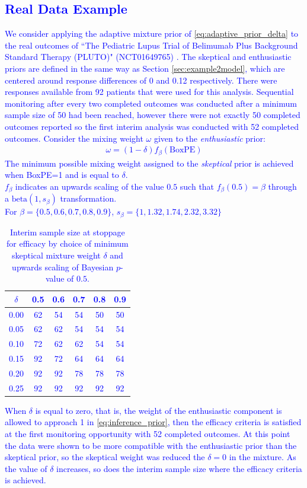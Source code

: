 \documentclass[AMA,STIX1COL,doublespace]{WileyNJD-v2}
\begin{document}
\textcolor{blue}{
\section{Real Data Example}
We consider applying the adaptive mixture prior of \eqref{eq:adaptive_prior_delta} to the real outcomes of ``The Pediatric Lupus Trial of Belimumab Plus Background Standard Therapy (PLUTO)" (NCT01649765) \citep{Brunner2020}. The skeptical and enthusiastic priors are defined in the same way as Section \ref{sec:example2model}, which are centered around response differences of 0 and 0.12 respectively. There were responses available from 92 patients that were used for this analysis. Sequential monitoring after every two completed outcomes was conducted after a minimum sample size of 50 had been reached, however there were not exactly 50 completed outcomes reported so the first interim analysis was conducted with 52 completed outcomes.
\newpage
Consider the mixing weight $\omega$ given to the \textit{enthusiastic} prior:
\begin{align*}
\omega= (1 - \delta)f_\beta(\text{BoxPE})
\end{align*}
The minimum possible mixing weight assigned to the \textit{skeptical} prior is achieved when BoxPE=1 and is equal to  $\delta$.
\\
$f_\beta$ indicates an upwards scaling of the value $0.5$ such that $f_\beta(0.5)=\beta$ through a $\text{beta}(1, s_\beta)$ transformation.
\\
For $\beta=\{0.5, 0.6, 0.7, 0.8, 0.9\}$, $s_\beta=\{1, 1.32, 1.74, 2.32, 3.32\}$
\begin{center}
\begin{table}\label{tbl:real-pluto}%
\centering
\caption{Interim sample size at stoppage for efficacy by choice of minimum skeptical mixture weight $\delta$ and upwards scaling of Bayesian $p$-value of $0.5$.}%
\begin{tabular*}{300pt}{@{\extracolsep\fill}cccccc@{\extracolsep\fill}}%
\toprule
\textbf{$\delta$} & 0.5	&	0.6	&	0.7	&	0.8	&	0.9\\
\midrule
0.00	&	62	&	54	&	54	&	50	&	50	\\
0.05	&	62	&	62	&	54	&	54	&	54	\\
0.10	&	72	&	62	&	62	&	54	&	54	\\
0.15	&	92	&	72	&	64	&	64	&	64	\\
0.20	&	92	&	92	&	78	&	78	&	78	\\
0.25	&	92	&	92	&	92	&	92	&	92	\\
\bottomrule
\end{tabular*}
\end{table}
\end{center}
\newpage
When $\delta$ is equal to zero, that is, the weight of the enthusiastic component is allowed to approach 1 in \eqref{eq:inference_prior}, then the efficacy criteria is satisfied at the first monitoring opportunity with 52 completed outcomes. At this point the data were shown to be more compatible with the enthusiastic prior than the skeptical prior, so the skeptical weight was reduced the $\delta=0$ in the mixture. As the value of $\delta$ increases, so does the interim sample size where the efficacy criteria is achieved.}
\end{document}

